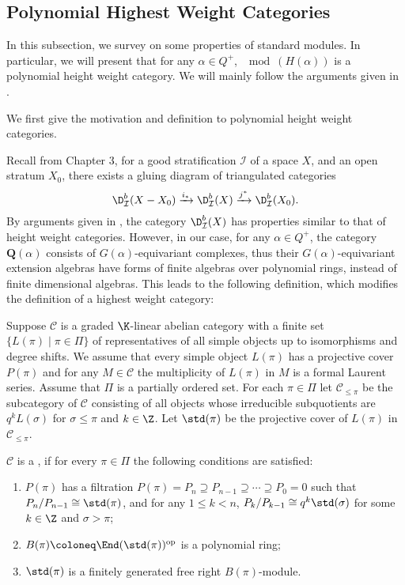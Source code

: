 \subsection{Polynomial Highest Weight Categories}

In this subsection, we survey on some properties of standard modules.
In particular, we will present that for any $\alpha\in Q^+$,
$\mod(H(\alpha))$ is a polynomial height weight category.
We will mainly follow the arguments given in \cite{BKM}.

We first give the motivation and definition to polynomial height weight categories.

Recall from Chapter 3, for a good stratification
$\mathcal{I}$ of a space $X$, and an open stratum $X_0$,
there exists a gluing diagram of triangulated categories
\[
    \D^b_{\mathcal{I}}(X-X_0)\xrightarrow{i_*}\D^b_{\mathcal{I}}(X)\xrightarrow{j^*}\D^b_{\mathcal{I}}(X_0).
\]
By arguments given in \cite{CPS}, the category $\D^b_{\mathcal{I}}(X)$
has properties similar to that of height weight categories.
However, in our case, for any $\alpha\in Q^+$, the category $\mathbf{Q}(\alpha)$
consists of $G(\alpha)$-equivariant complexes, thus their $G(\alpha)$-equivariant
extension algebras have forms of finite algebras over polynomial rings,
instead of finite dimensional algebras. This leads to the following definition,
which modifies the definition of a highest weight category:

\begin{definition}
    Suppose $\mathcal{C}$ is a graded $\K$-linear abelian category
    with a finite set $\{L(\pi)\mid\pi\in\Pi\}$ of representatives
    of all simple objects up to isomorphisms and degree shifts.
    We assume that every simple object $L(\pi)$ has a projective cover
    $P(\pi)$ and for any $M\in\mathcal{C}$ the multiplicity of $L(\pi)$
    in $M$ is a formal Laurent series. Assume that $\Pi$ is a partially
    ordered set. For each $\pi\in\Pi$ let $\mathcal{C}_{\le\pi}$
    be the subcategory of $\mathcal{C}$ consisting of all objects
    whose irreducible subquotients are $q^kL(\sigma)$ for $\sigma\le\pi$
    and $k\in\Z$. Let $\std(\pi)$ be the projective cover of
    $L(\pi)$ in $\mathcal{C}_{\le\pi}$.

    $\mathcal{C}$ is a ,
    if for every $\pi\in\Pi$ the following conditions are satisfied:
    \begin{enumerate}[1)]
        \item $P(\pi)$ has a filtration $P(\pi) = P_n\supseteq
        P_{n-1}\supseteq\cdots\supseteq P_0 = 0$ such that 
        $P_n/P_{n-1}\cong\std(\pi)$, and for any $1\le k<n$,
        $P_k/P_{k-1}\cong q^k\std(\sigma)$ for some $k\in\Z$ and $\sigma>\pi$;
        \item $B(\pi) \coloneq  \End(\std(\pi))^{\mathrm{op}}$ is a polynomial ring;
        \item $\std(\pi)$ is a finitely generated free right $B(\pi)$-module.
    \end{enumerate}
\end{definition}

